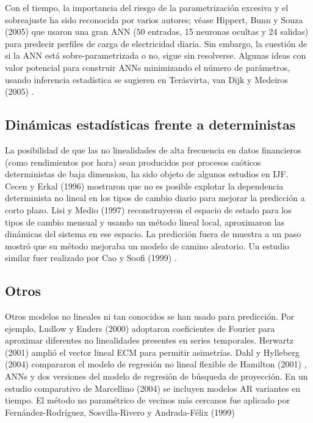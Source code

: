 \documentclass{llncs}
\begin{document}
Con el tiempo, la importancia del riesgo de la parametrización excesiva y el sobreajuste ha sido reconocida por varios autores; véase Hippert, Bunn y Souza (2005) \cite{Hippert2005425} que usaron una gran ANN (50 entradas, 15 neuronas ocultas y 24 salidas) para predecir perfiles de carga de electricidad diaria. Sin embargo, la cuestión de si la ANN está sobre-parametrizada o no, sigue sin resolverse. Algunas ideas con valor potencial para construir ANNs minimizando el número de parámetros, usando inferencia estadística se sugieren en Teräsvirta, van Dijk y Medeiros (2005) \cite{Terasvirta2005755}.

\subsection{Dinámicas estadísticas frente a deterministas}
La posibilidad de que las no linealidades de alta frecuencia en datos financieros (como rendimientos por hora) sean producidos por procesos caóticos deterministas de baja dimension, ha sido objeto de algunos estudios en IJF. Cecen y Erkal (1996) \cite{Cecen1996465} mostraron que no es posible explotar la dependencia determinista no lineal en los tipos de cambio diario para mejorar la predicción a corto plazo. Lisi y Medio (1997) \cite{Lisi1997255} reconstruyeron el espacio de estado para los tipos de cambio mensual y usando un método lineal local, aproximaron las dinámicas del sistema en ese espacio. La predicción fuera de muestra a un paso mostró que su método mejoraba un modelo de camino aleatorio. Un estudio similar fuer realizado por Cao y Soofi (1999) \cite{Cao1999421}.

\subsection{Otros}
Otros modelos no lineales ni tan conocidos se han usado para predicción. Por ejemplo, Ludlow y Enders (2000) \cite{Ludlow2000333} adoptaron coeficientes de Fourier para aproximar diferentes no linealidades presentes en series temporales. Herwartz (2001) \cite{Herwartz2001231} amplió el vector lineal ECM para permitir asimetrías. Dahl y Hylleberg (2004) \cite{Dahl2004201} compararon el modelo de regresión no lineal flexible de Hamilton (2001) \cite{Hamilton2001537}, ANNs y dos versiones del modelo de regresión de búsqueda de proyección. En un estudio comparativo de Marcellino (2004) \cite{Marcellino2004359} se incluyen modelos AR variantes en tiempo. El método no paramétrico de vecinos más cercanos fue aplicado por  Fernández-Rodríguez, Sosvilla-Rivero y Andrada-Félix (1999) \cite{Fernandez-Rodriguez1999383}
\end{document}

